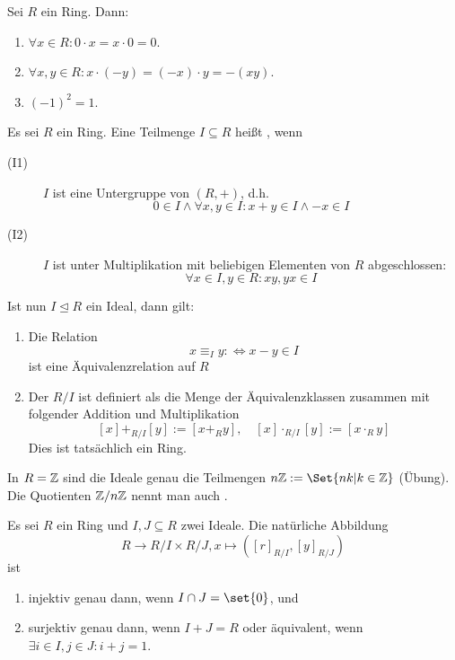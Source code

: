 \begin{lemma}
    Sei $R$ ein Ring. Dann:
    \begin{enumerate}
        \item $\forall x \in R : 0\cdot x = x \cdot 0 = 0$.
        \item $\forall x,y \in R : x\cdot(-y)=(-x)\cdot y = -(xy)$.
        \item $(-1)^2 = 1$.
    \end{enumerate}
\end{lemma}

\begin{lemmadef}
    Es sei $R$ ein Ring. Eine Teilmenge $I\subseteq R$ heißt , wenn
    \begin{description}
        \item[(I1)] $I$ ist eine Untergruppe von $(R,+)$, d.h.
        \[0\in I \wedge \forall x,y\in I: x+y\in I \wedge -x\in I\]
        \item[(I2)] $I$ ist unter Multiplikation mit beliebigen Elementen von $R$ abgeschlossen:
        \[\forall x\in I, y\in R: xy,yx\in I\]
    \end{description}

    Ist nun $I \unlhd R$ ein Ideal, dann gilt:
    \begin{enumerate}
        \item Die Relation
        \[x \equiv_I y :\iff x-y\in I\]
        ist eine Äquivalenzrelation auf $R$
        \item Der  $R/I$ ist definiert als die Menge der Äquivalenzklassen zusammen mit folgender Addition und Multiplikation
        \[[x] +_{R/I} [y] := [x +_R y],  \quad [x] \cdot_{R/I} [y] := [x \cdot_R y]\]
        Dies ist tatsächlich ein Ring.
    \end{enumerate}
\end{lemmadef}

\begin{example}
    In $R=\mathbb{Z}$ sind die Ideale genau die Teilmengen $n\IZ:=\Set{nk | k \in\IZ}$ (Übung). Die Quotienten $\mathbb{Z}/n\mathbb{Z}$ nennt man auch .
\end{example}

\begin{theorem}
    Es sei $R$ ein Ring und $I,J\subseteq R$ zwei Ideale. Die natürliche Abbildung
    \[ R\to R/I \times R/J, x\mapsto ([r]_{R/I}, [y]_{R/J})\]
    ist
    \begin{enumerate}
        \item injektiv genau dann, wenn $I\cap J = \set{0}$, und
        \item surjektiv genau dann, wenn $I+J=R$ oder äquivalent, wenn $\exists i\in I,j\in J: i+j=1$.
    \end{enumerate}
\end{theorem}

